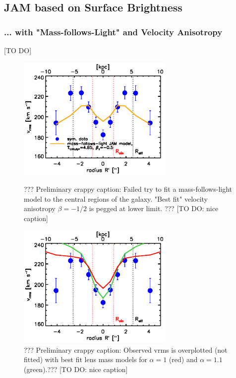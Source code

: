 \subsection{JAM based on Surface Brightness}

\subsubsection{... with "Mass-follows-Light" and Velocity Anisotropy}

[TO DO]

\begin{figure}
\centering
\begin{minipage}{.5\textwidth}
  \centering
  \includegraphics[height=6cm]{fig/jam_A2_vrms.ps}
  \caption{??? Preliminary crappy caption: Failed try to fit a mass-follows-light model to the central regions of the galaxy. "Best fit" velocity anisotropy $\beta = -1/2$ is pegged at lower limit. ??? [TO DO: nice caption]}
  \label{fig:???}
\end{minipage}%
\begin{minipage}{.5\textwidth}
  \centering
  \includegraphics[height=6cm]{fig/lensing_JAM_comparision.ps}
  \caption{??? Preliminary crappy caption: Observed vrms is overplotted (not fitted) with best fit lens mass models for $\alpha = 1$ (red) and $\alpha = 1.1$ (green).??? [TO DO: nice caption]}
  \label{fig:???}
\end{minipage}
\end{figure}

